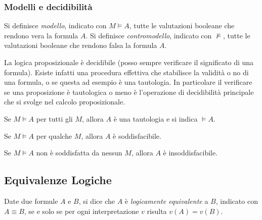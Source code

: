 \documentclass[a4paper,12pt, oneside]{book}
\begin{document}
\subsubsection{Modelli e decidibilità}
Si definisce \emph{modello}, indicato con $M \models A$, tutte le valutazioni
booleane 
che rendono vera la formula $A$.
Si definisce \emph{contromodello}, indicato con $\not\models$, tutte le
valutazioni booleane 
che rendono falsa la formula $A$.

La logica proposizionale è decidibile (posso sempre verificare il significato di
una formula). 
Esiste infatti una procedura effettiva che stabilisce la validità o no di una
formula, o se questa 
ad esempio è una tautologia.
In particolare il verificare se una proposizione è tautologica o meno è
l’operazione di decidibilità principale che si svolge nel calcolo
proposizionale. 

\begin{definizione}
  Se $M \models A$ per tutti gli $M$, allora $A$ è una tautologia e si indica
  $\models A$.
\end{definizione}

\begin{definizione}
  Se $M \models A$ per qualche $M$, allora $A$ è soddisfacibile.
\end{definizione}

\begin{definizione}
  Se $M \models A$ non è soddisfatta da nessun $M$, allora $A$ è
  insoddisfacibile.
\end{definizione}
\subsection{Equivalenze Logiche}
\begin{definizione}
  Date due formule $A$ e $B$, si dice che $A$ è \emph{logicamente equivalente} a
  $B$, 
  indicato con $A \equiv B$, se e solo se per ogni interpretazione $v$ risulta
  $v(A) = v(B)$. 
\end{definizione}
\end{document}
